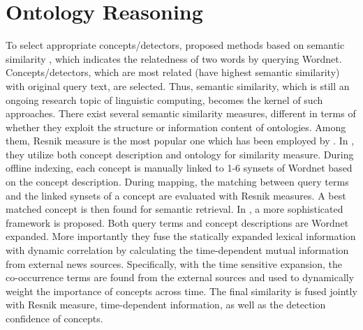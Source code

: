 \section{Ontology Reasoning}
\label{sec:ontology_reasoning} To select appropriate
concepts/detectors,
\cite{Yu-Gang.Jiang:NISTTRECVID:2006,CeesG.M.Snoek:IEEETM:2006,Shih-Fu.Chang:NISTTRECVID:2005}
 proposed methods based on semantic similarity
\cite{Philip.Resnik:IJCAI:1995}, which indicates the relatedness of
two words by querying Wordnet. Concepts/detectors, which are most
related (have highest semantic similarity) with original query text,
are selected. Thus, semantic similarity, which is still an ongoing
research topic of linguistic computing, becomes the kernel of such
approaches. There exist several semantic similarity measures,
different in terms of whether they exploit the structure or
information content of ontologies. Among them, Resnik measure
\cite{Philip.Resnik:IJCAI:1995} is the most popular one which has
been employed by
\cite{CeesG.M.Snoek:IEEETM:2006,Shih-Fu.Chang:NISTTRECVID:2005}. In
\cite{CeesG.M.Snoek:IEEETM:2006,Tat-Seng.Chua:NISTTRECVID:2006},
they utilize both concept description and ontology for similarity
measure. During offline indexing, each concept is manually linked to
1-6 synsets of Wordnet based on the concept description. During
mapping, the matching between query terms and the linked synsets of
a concept are evaluated with Resnik measures. A best matched concept
is then found for semantic retrieval. In
\cite{Tat-Seng.Chua:NISTTRECVID:2006,Shi-YongNeo:ICOIVR:2006}, a
more sophisticated framework is proposed. Both query terms and
concept descriptions are Wordnet expanded. More importantly they
fuse the statically expanded lexical information with dynamic
correlation by calculating the time-dependent mutual information
from external news sources. Specifically, with the time sensitive
expansion, the co-occurrence terms are found from the external
sources and used to dynamically weight the importance of concepts
across time. The final similarity is fused jointly with Resnik
measure, time-dependent information, as well as the detection
confidence of concepts.

